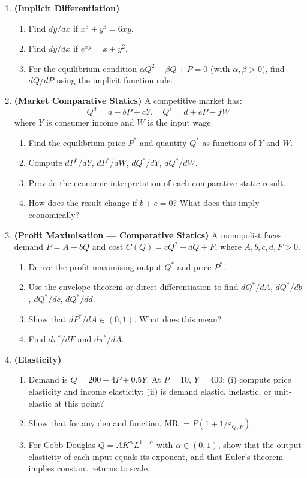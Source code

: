 \documentclass[12pt, a4paper]{article}
\theoremstyle{definition}
\begin{document}
\begin{enumerate}[label=\textbf{D\arabic*.}, leftmargin=2.5em]

\item \textbf{(Implicit Differentiation)}
\begin{enumerate}[label=(\alph*)]
  \item Find $dy/dx$ if $x^3 + y^3 = 6xy$.
  \item Find $dy/dx$ if $e^{xy} = x + y^2$.
  \item For the equilibrium condition $\alpha Q^2 - \beta Q + P = 0$
    (with $\alpha,\beta>0$), find $dQ/dP$ using the implicit function rule.
\end{enumerate}

\item \textbf{(Market Comparative Statics)}
A competitive market has:
\[
  Q^d = a - bP + cY, \quad Q^s = d + eP - fW
\]
where $Y$ is consumer income and $W$ is the input wage.
\begin{enumerate}[label=(\alph*)]
  \item Find the equilibrium price $P^*$ and quantity $Q^*$ as functions of
    $Y$ and $W$.
  \item Compute $dP^*/dY$, $dP^*/dW$, $dQ^*/dY$, $dQ^*/dW$.
  \item Provide the economic interpretation of each comparative-static result.
  \item How does the result change if $b+e = 0$? What does this imply
    economically?
\end{enumerate}

\item \textbf{(Profit Maximisation --- Comparative Statics)}
A monopolist faces demand $P = A - bQ$ and cost $C(Q) = cQ^2 + dQ + F$,
where $A, b, c, d, F > 0$.
\begin{enumerate}[label=(\alph*)]
  \item Derive the profit-maximising output $Q^*$ and price $P^*$.
  \item Use the envelope theorem or direct differentiation to find
    $dQ^*/dA$, $dQ^*/db$, $dQ^*/dc$, $dQ^*/dd$.
  \item Show that $dP^*/dA \in (0,1)$. What does this mean?
  \item Find $d\pi^*/dF$ and $d\pi^*/dA$.
\end{enumerate}

\item \textbf{(Elasticity)}
\begin{enumerate}[label=(\alph*)]
  \item Demand is $Q = 200 - 4P + 0.5Y$. At $P=10$, $Y=400$:
    (i) compute price elasticity and income elasticity;
    (ii) is demand elastic, inelastic, or unit-elastic at this point?
  \item Show that for any demand function, MR $= P(1 + 1/\varepsilon_{Q,P})$.
  \item For Cobb-Douglas $Q = AK^\alpha L^{1-\alpha}$ with $\alpha\in(0,1)$,
    show that the output elasticity of each input equals its exponent, and
    that Euler's theorem implies constant returns to scale.
\end{enumerate}

\end{enumerate}
\end{document}
